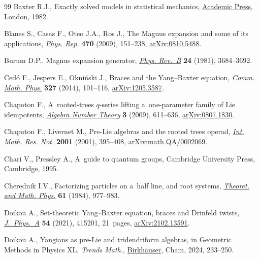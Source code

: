 \begin{thebibliography}{99}
Baxter R.J., Exactly solved models in statistical mechanics,
 \href{https://doi.org/10.1142/9789814415255_0002}{Academic Press}, London,
 1982.

Blanes S., Casas F., Oteo J.A., Ros J., The {M}agnus expansion and some of its
 applications,
 \href{https://doi.org/10.1016/j.physrep.2008.11.001}{\textit{Phys. Rep.}}
 \textbf{470} (2009), 151--238,
 \href{http://arxiv.org/abs/0810.5488}{arXiv:0810.5488}.

Burum D.P., Magnus expansion generator,
 \href{https://doi.org/10.1103/PhysRevB.24.3684}{\textit{Phys. Rev.~B}}
 \textbf{24} (1981), 3684--3692.

Ced\'o F., Jespers E., Okni\'{n}ski J., Braces and the {Y}ang--{B}axter
 equation, \href{https://doi.org/10.1007/s00220-014-1935-y}{\textit{Comm.
 Math. Phys.}} \textbf{327} (2014), 101--116,
 \href{http://arxiv.org/abs/1205.3587}{arXiv:1205.3587}.

Chapoton F., A~rooted-trees {$q$}-series lifting a~one-parameter family of
 {L}ie idempotents,
 \href{https://doi.org/10.2140/ant.2009.3.611}{\textit{Algebra Number Theory}}
 \textbf{3} (2009), 611--636,
 \href{http://arxiv.org/abs/0807.1830}{arXiv:0807.1830}.

Chapoton F., Livernet M., Pre-{L}ie algebras and the rooted trees operad,
 \href{https://doi.org/10.1155/S1073792801000198}{\textit{Int. Math. Res.
 Not.}} \textbf{2001} (2001), 395--408,
 \href{http://arxiv.org/abs/math.QA/0002069}{arXiv:math.QA/0002069}.

Chari V., Pressley A., A~guide to quantum groups, Cambridge University Press,
 Cambridge, 1995.

Cherednik I.V., Factorizing particles on a~half line, and root systems,
 \href{https://doi.org/10.1007/BF01038545}{\textit{Theoret. and Math. Phys.}}
 \textbf{61} (1984), 977--983.

Doikou A., Set-theoretic {Y}ang--{B}axter equation, braces and {D}rinfeld
 twists, \href{https://doi.org/10.1088/1751-8121/ac219e}{\textit{J.~Phys.~A}}
 \textbf{54} (2021), 415201, 21~pages,
 \href{http://arxiv.org/abs/2102.13591}{arXiv:2102.13591}.

Doikou A., Yangians as pre-{L}ie and tridendriform algebras, in Geometric
 Methods in Physics {XL}, \textit{Trends Math.},
 \href{https://doi.org/10.1007/978-3-031-62407-0_18}{Birkh\"auser}, Cham,
 2024, 233--250.


\end{thebibliography}
